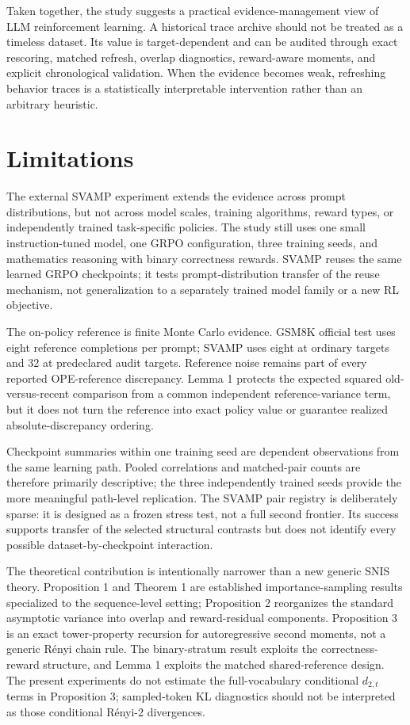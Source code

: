 \documentclass[10pt]{article}
\theoremstyle{remark}
\begin{document}
Taken together, the study suggests a practical evidence-management view of LLM reinforcement learning. A historical trace archive should not be treated as a timeless dataset. Its value is target-dependent and can be audited through exact rescoring, matched refresh, overlap diagnostics, reward-aware moments, and explicit chronological validation. When the evidence becomes weak, refreshing behavior traces is a statistically interpretable intervention rather than an arbitrary heuristic.

\section{Limitations}
The external SVAMP experiment extends the evidence across prompt distributions, but not across model scales, training algorithms, reward types, or independently trained task-specific policies. The study still uses one small instruction-tuned model, one GRPO configuration, three training seeds, and mathematics reasoning with binary correctness rewards. SVAMP reuses the same learned GRPO checkpoints; it tests prompt-distribution transfer of the reuse mechanism, not generalization to a separately trained model family or a new RL objective.

The on-policy reference is finite Monte Carlo evidence. GSM8K official test uses eight reference completions per prompt; SVAMP uses eight at ordinary targets and 32 at predeclared audit targets. Reference noise remains part of every reported OPE-reference discrepancy. Lemma 1 protects the expected squared old-versus-recent comparison from a common independent reference-variance term, but it does not turn the reference into exact policy value or guarantee realized absolute-discrepancy ordering.

Checkpoint summaries within one training seed are dependent observations from the same learning path. Pooled correlations and matched-pair counts are therefore primarily descriptive; the three independently trained seeds provide the more meaningful path-level replication. The SVAMP pair registry is deliberately sparse: it is designed as a frozen stress test, not a full second frontier. Its success supports transfer of the selected structural contrasts but does not identify every possible dataset-by-checkpoint interaction.

The theoretical contribution is intentionally narrower than a new generic SNIS theory. Proposition 1 and Theorem 1 are established importance-sampling results specialized to the sequence-level setting; Proposition 2 reorganizes the standard asymptotic variance into overlap and reward-residual components. Proposition 3 is an exact tower-property recursion for autoregressive second moments, not a generic R\'enyi chain rule. The binary-stratum result exploits the correctness-reward structure, and Lemma 1 exploits the matched shared-reference design. The present experiments do not estimate the full-vocabulary conditional $d_{2,t}$ terms in Proposition 3; sampled-token KL diagnostics should not be interpreted as those conditional R\'enyi-2 divergences.
\end{document}
